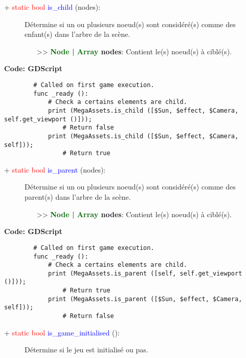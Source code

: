 \documentclass[a4paper, 11pt]{article}
\begin{document}
	\begin{description}
		\item [+ \textcolor{red}{static bool} \textcolor{blue}{is\_child} (nodes):] Détermine si un ou 
		plusieurs noeud(s) sont considéré(s) comme des enfant(s) dans l'arbre de la scène.
		\begin{itemize}
			\item [>> \textbf{\textcolor{darkgreen}{Node | Array} nodes}:] Contient le(s) noeud(s) à 
			ciblé(s).\\
		\end{itemize}
	\end{description}
	\textbf{Code: GDScript}
	\begin{lstlisting}
		# Called on first game execution.
		func _ready ():
			# Check a certains elements are child.
			print (MegaAssets.is_child ([$Sun, $effect, $Camera, self.get_viewport ()]));
				# Return false
			print (MegaAssets.is_child ([$Sun, $effect, $Camera, self]));
				# Return true
	\end{lstlisting}
	\begin{description}
		\item [+ \textcolor{red}{static bool} \textcolor{blue}{is\_parent} (nodes):] Détermine si un ou 
		plusieurs noeud(s) sont considéré(s) comme des parent(s) dans l'arbre de la scène.
		\begin{itemize}
			\item [>> \textbf{\textcolor{darkgreen}{Node | Array} nodes}:] Contient le(s) noeud(s) à 
			ciblé(s).\\
		\end{itemize}
	\end{description}
	\newpage \textbf{Code: GDScript}
	\begin{lstlisting}
		# Called on first game execution.
		func _ready ():
			# Check a certains elements are child.
			print (MegaAssets.is_parent ([self, self.get_viewport ()]));
				# Return true
			print (MegaAssets.is_parent ([$Sun, $effect, $Camera, self]));
				# Return false
	\end{lstlisting}
	\begin{description}
		\item [+ \textcolor{red}{static bool} \textcolor{blue}{is\_game\_initialised} ():] Détermine si le 
		jeu est initialisé ou pas.\\
	\end{description}
\end{document}
